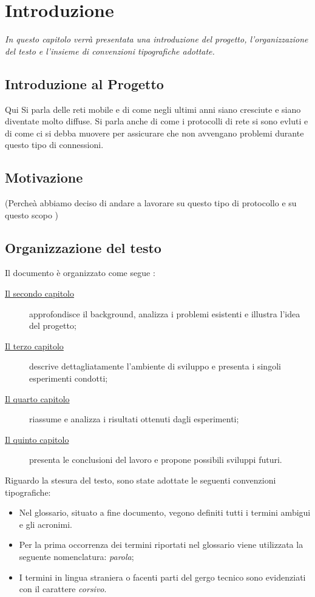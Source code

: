 \chapter{Introduzione}
\label{cap:introduzione}

\textit{\indent In questo capitolo verrà presentata una introduzione del progetto, l'organizzazione del testo e l'insieme di convenzioni tipografiche adottate.
}
\section{Introduzione al Progetto}

Qui Si parla delle reti mobile e di come negli ultimi anni siano cresciute e siano diventate molto diffuse. Si parla anche di come i protocolli di rete si sono evluti e di come ci si debba muovere per assicurare che non avvengano problemi durante questo tipo di connessioni. 


\section{Motivazione}

(Percheà abbiamo deciso di andare a lavorare su questo tipo di protocollo e su questo scopo )
\section{Organizzazione del testo}

\indent Il documento è organizzato come segue :
\begin{description}
    \item[{\hyperref[cap:descrizione]{Il secondo capitolo}}] approfondisce il background, analizza i problemi esistenti e illustra l'idea del progetto;
    
    \item[{\hyperref[cap:processi-metodologie]{Il terzo capitolo}}] descrive dettagliatamente l'ambiente di sviluppo e presenta i singoli esperimenti condotti;

    \item[{\hyperref[cap:risultati]{Il quarto capitolo}}] riassume e analizza i risultati ottenuti dagli esperimenti;
    
    \item[{\hyperref[cap:conclusioni]{Il quinto capitolo}}] presenta le conclusioni del lavoro e propone possibili sviluppi futuri.
\end{description}

Riguardo la stesura del testo, sono state adottate le seguenti convenzioni tipografiche:
\begin{itemize}
	\item Nel glossario, situato a fine documento, vegono definiti tutti i termini ambigui e gli acronimi.
	\item Per la prima occorrenza dei termini riportati nel glossario viene utilizzata la seguente nomenclatura: \emph{parola}\glsfirstoccur;
	\item I termini in lingua straniera o facenti parti del gergo tecnico sono evidenziati con il carattere \emph{corsivo}.
\end{itemize}
